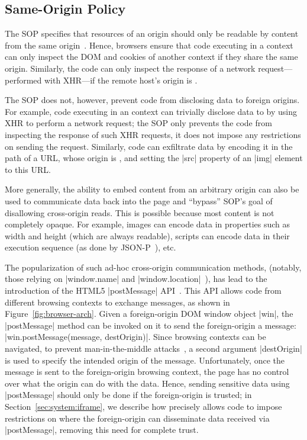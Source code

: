 \subsection{Same-Origin Policy}
\label{sec:background:sop}

The SOP specifies that resources of an origin should only be readable
by content from the same origin~\cite{rfc6454, googlehandbook,
VanKesteren2012}.
%
Hence, browsers ensure that code executing in a  context
can only inspect the DOM and cookies of another context if they share
the same origin.
%
Similarly, the code can only inspect the response of a network
request---performed with XHR---if the remote host's origin is
.
%
 
The SOP does not, however, prevent code from disclosing data to
foreign origins.
%
For example, code executing in an  context can trivially
disclose data to  by using XHR to perform a network
request; the SOP only prevents the code from inspecting the response
of such XHR requests, it does not impose any restrictions on sending
the request.
%
Similarly, code can exfiltrate data by encoding it in the path of a
URL, whose origin is , and setting the \js|src| property
of an \js|img| element to this URL.

More generally, the ability to embed content from an arbitrary origin
can also be used to communicate data back into the page and ``bypass''
SOP's goal of disallowing cross-origin reads.
%
This is possible because most content is not completely opaque. 
%
For example, images can encode data in properties such as width and
height (which are always readable), scripts can encode data in their
execution sequence (as done by JSON-P~\cite{jsonp}), etc.
%

The popularization of such ad-hoc cross-origin communication methods,
(notably, those relying on \js|window.name| and
\js|window.location|~\cite{thidpartyjs}), has lead to the
introduction of the HTML5 \js|postMessage| API~\cite{webmessaging}.
%
This API allows code from different browsing contexts to exchange
messages, as shown in Figure~\ref{fig:browser-arch}.
%
Given a foreign-origin DOM window object \js|win|, the
\js|postMessage| method can be invoked on it to send the
foreign-origin a message: \js|win.postMessage(message, destOrigin)|.
%
Since browsing contexts can be navigated, to prevent man-in-the-middle
attacks~\cite{barth2009securing}, a second argument
\js|destOrigin| is used to specify the intended origin of the message.
%
Unfortunately, once the message is sent to the foreign-origin browsing
context, the page has no control over what the origin can do with the
data.
%
Hence, sending sensitive data using \js|postMessage| should only be
done if the foreign-origin is trusted;
%
in Section~\ref{sec:system:iframe}, we describe how \sys{} precisely
allows code to impose restrictions on where the foreign-origin can
disseminate data received via \js|postMessage|, removing this need for
complete trust.

